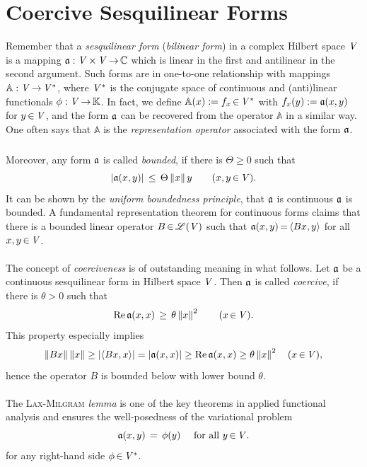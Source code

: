 \documentclass[11pt,twoside]{article}
\begin{document}
\section{Coercive Sesquilinear Forms}
Remember that a \textit{sesquilinear form} (\textit{bilinear form})
in a complex Hilbert space $\mathit{V}$ is a mapping
$\mathfrak{a}:\mathit{V} {\,\times\,} \mathit{V} {\,\to\,} {\mathbb{C}}$
which is linear in the first and antilinear in the second argument.
Such forms are in one-to-one relationship with mappings
$\mathbb{A}:\mathit{V} {\,\to\,} \mathit{V}^*$,
where $\mathit{V}^*$ is the conjugate space
of continuous and (anti)linear functionals $\phi:\mathit{V} {\,\to\,} {\mathbb{K}}$.
In fact,
we define $\mathbb{A}(x) := f_x {\,\in\,} \mathit{V}^*$
with $f_x(y) := \mathfrak{a}(x,y)$ for $y {\,\in\,} \mathit{V}$,
and the form $\mathfrak{a}$ can be recovered from the operator $\mathbb{A}$
in a similar way.
One often says that $\mathbb{A}$ is the \textit{representation operator}
associated with the form $\mathfrak{a}$.

\subparagraph*{}
Moreover,
any form $\mathfrak{a}$ is called \textit{bounded},
if there is $\Theta \geq 0$ such that
\[
\abs{\sql(x,y)} \, \leq \, \Theta \norm{x}{y} \quad \quad (x,y \xeof \vecV).
\]
It can be shown by the \textit{uniform boundedness principle},
that $\mathfrak{a}$ is continuous \iff $\mathfrak{a}$ is bounded.
A fundamental representation theorem for continuous forms claims
that there is a bounded linear operator $B {\,\in\,} \mathscr{L}(\mathit{V})$ such that
$\mathfrak{a}(x,y) {\,=\,} \langle B x,y \rangle$ for all $x,y {\,\in\,} \mathit{V}$.

\paragraph*{}
The concept of \textit{coerciveness} is of outstanding meaning in what follows.
Let $\mathfrak{a}$ be a continuous sesquilinear form in Hilbert space $\mathit{V}$.
Then $\mathfrak{a}$ is called \textit{coercive},
if there is $\theta > 0$ such that
\[
\operatorname{Re} \mathfrak{a}(x,x) \, \geq \, \theta \left\lVert x \right\rVert^2 \quad \quad (x {\,\in\,} \mathit{V}).
\]
This property especially implies
\[
\norm{B x}\norm{x} \geq
\abs{\scalar{B x}{x}} =
\abs{\sql(x,x)} \geq
\re \sql(x,x) \geq
\theta \norm{x}^2 \quad (x \xeof \vecV),
\]
hence the operator $B$ is bounded below with lower bound $\theta$.

\paragraph*{} %
The \textsc{Lax-Milgram} \textit{lemma} is one of the key theorems
in applied functional analysis
and ensures the well-posedness of the variational problem
\begin{equation}\label{VARIATIONAL_EQUATION}
\mathfrak{a}(x,y) \,=\, \phi(y) \quad \mbox{ for all } y {\,\in\,} \mathit{V}.
\end{equation}
for any right-hand side $\phi {\,\in\,} \mathit{V}^*$.
\end{document}
